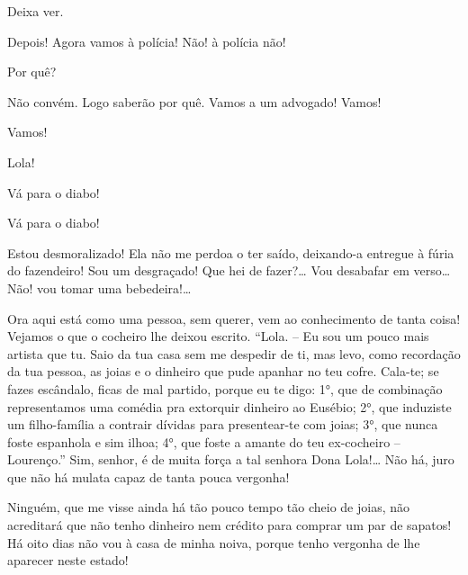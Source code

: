  Deixa ver.

 Depois! Agora vamos à polícia! Não! à polícia não!

 Por quê?

 Não convém. Logo saberão por quê. Vamos a um advogado!  Vamos!

 Vamos! 

 Lola!

  Vá para o diabo!

 Vá para o diabo! 

  Estou desmoralizado! Ela não me perdoa o ter saído, 
deixando-a entregue à fúria do fazendeiro! Sou um desgraçado! Que hei de
fazer?\ldots{} Vou desabafar em verso\ldots{} Não! vou tomar uma bebedeira!\ldots{} 


 Ora aqui está como uma pessoa, sem querer, vem ao conhecimento 
de tanta coisa! Vejamos o que o cocheiro lhe deixou escrito.  “Lola. -- Eu sou um pouco mais artista que tu. Saio da tua casa sem me
despedir de ti, mas levo, como recordação da tua pessoa, as joias e o dinheiro que pude
apanhar no teu cofre. Cala-te; se fazes escândalo, ficas de mal partido, porque eu
te digo: 1°, que de combinação representamos uma comédia pra extorquir dinheiro ao
Eusébio; 2°, que induziste um filho-família a contrair dívidas para presentear-te
com joias; 3°, que nunca foste espanhola e sim ilhoa; 4°, que foste a amante do teu
ex-cocheiro -- Lourenço.” Sim, senhor, é de muita força a tal senhora Dona Lola!\ldots{} Não
há, juro que não há mulata capaz de tanta pouca vergonha! 



 Ninguém, que me visse ainda há tão pouco tempo tão cheio de
joias, não acreditará que não tenho dinheiro nem crédito para comprar um par de
sapatos! Há oito dias não vou à casa de minha noiva, porque tenho vergonha de lhe
aparecer neste estado!

